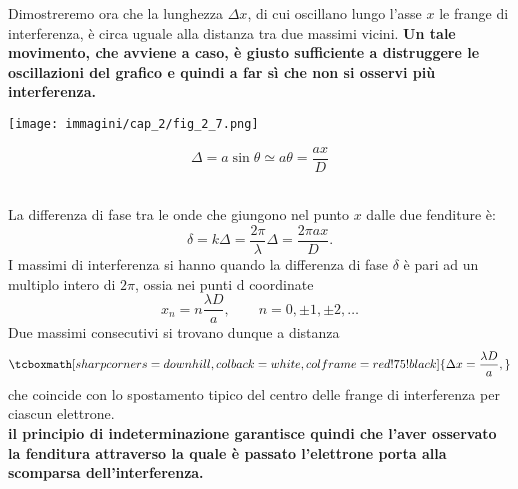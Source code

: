 Dimostreremo ora che la lunghezza $\Delta x$, di cui oscillano lungo l'asse $x$ le frange di interferenza, è circa uguale alla distanza tra due massimi vicini. \textbf{Un tale movimento, che avviene a caso, è giusto sufficiente a distruggere le oscillazioni del grafico e quindi a far sì che non si osservi più interferenza.}\\
\vspace{1cm}
\begin{minipage}{.5\textwidth}
\texttt{[image: immagini/cap\_2/fig\_2\_7.png]}	
\end{minipage}
\begin{minipage}{.5\textwidth}
\begin{equation}
\Delta = a \sin \theta \simeq a \theta = \frac{ax}{D}
\end{equation}
\end{minipage}\\
\vspace{.5cm}
La differenza di fase tra le onde che giungono nel punto $x$ dalle due fenditure è:
	\begin{equation}
		\delta = k\Delta =\frac{2 \pi }{\lambda}\Delta = \frac{2 \pi a x}{D}.
	\end{equation}
I massimi di interferenza si hanno quando la differenza di fase $\delta $ è pari ad un multiplo intero di $2 \pi$, ossia nei punti d coordinate
	\begin{equation}
		x_n =n\frac{\lambda D}{a}, \qquad n=0,\pm 1, \pm 2, \dots 
	\end{equation}
Due massimi consecutivi si trovano dunque a distanza 
	\begin{equation}
		\tcboxmath[sharp corners=downhill ,colback=white,colframe=red!75!black]{
			\Delta x = \frac{\lambda D}{a},
			}
	\end{equation}
che coincide con lo spostamento tipico del centro delle frange di interferenza per ciascun elettrone.\\

\textbf{il principio di indeterminazione garantisce quindi che l'aver osservato la fenditura attraverso la quale è passato l'elettrone porta alla scomparsa dell'interferenza.}

